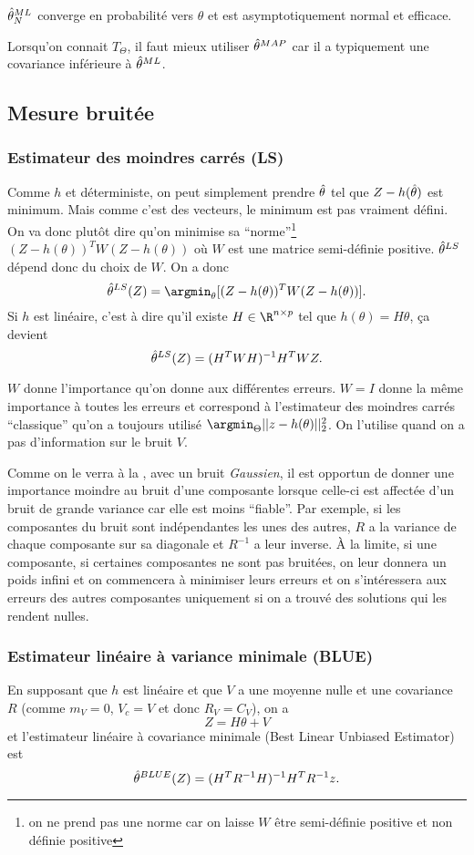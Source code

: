 $\hat{\theta}^{ML}_N$ converge en probabilité vers $\theta$ et est
asymptotiquement normal et efficace. %

Lorsqu'on connait $T_{\Theta}$, il faut mieux utiliser $\hat{\theta}^{MAP}$ car il
a typiquement une covariance inférieure à $\hat{\theta}^{ML}$.

\subsection{Mesure bruitée}
\subsubsection{Estimateur des moindres carrés (LS)}
Comme $h$ et déterministe, on peut simplement prendre $\hat{\theta}$ tel que
$Z - h(\hat{\theta})$ est minimum.
Mais comme c'est des vecteurs, le minimum est pas vraiment défini.
On va donc plutôt dire qu'on minimise sa ``norme''\footnote{
  on ne prend pas une norme car on laisse $W$ être semi-définie positive et
  non définie positive}
$(Z-h(\theta))^TW(Z-h(\theta))$
où $W$ est une matrice semi-définie positive.
$\hat{\theta}^{LS}$ dépend donc du choix de $W$.
On a donc
\[ \esthls(Z) = \argmin_\theta[(Z-h(\theta))^TW(Z-h(\theta))]. \]
Si $h$ est linéaire, c'est à dire qu'il existe $H \in \R^{n \times p}$ tel que
$h(\theta) = H\theta$, ça devient
\[ \hat{\theta}^{LS}(Z) = (H^TWH)^{-1}H^TWZ. \]

$W$ donne l'importance qu'on donne aux différentes erreurs.
$W = I$ donne la même importance à toutes les erreurs et correspond à l'estimateur
des moindres carrés ``classique'' qu'on a toujours utilisé $\argmin_\Theta ||z-h(\theta)||_2^2$.
On l'utilise quand on a pas d'information sur le bruit $V$.

Comme on le verra à la ,
avec un bruit \emph{Gaussien}, il est opportun de donner
une importance moindre au bruit d'une composante lorsque celle-ci est affectée
d'un bruit de grande variance car elle est moins ``fiable''.
Par exemple,
si les composantes du bruit sont indépendantes les unes des autres, $R$ a la variance
de chaque composante sur sa diagonale et $R^{-1}$ a leur inverse.
À la limite, si une composante, si certaines composantes ne sont pas bruitées,
on leur donnera un poids infini et on commencera à minimiser leurs erreurs
et on s'intéressera aux erreurs des autres composantes uniquement si on a
trouvé des solutions qui les rendent nulles.

\subsubsection{Estimateur linéaire à variance minimale (BLUE)}
En supposant que $h$ est linéaire et que
$V$ a une moyenne nulle et une covariance $R$
(comme $m_V = 0$, $V_c = V$ et donc $R_V = C_V$),
on a
\[ Z = H\theta + V \]
et
l'estimateur linéaire à covariance minimale (Best Linear Unbiased Estimator)
est
\[ \hat{\theta}^{BLUE}(Z) = (H^TR^{-1}H)^{-1}H^TR^{-1}z. \]

